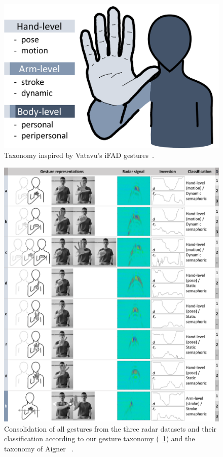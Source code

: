 \begin{figure}[h]
    \centering
    \includegraphics[width=.60\linewidth]{Figures/RadarExperiments/Datasets/20Gestures/gesture-taxonomy.pdf}
    \vspace{-2pt}
    \caption{Taxonomy inspired by Vatavu's iFAD gestures~\cite{Vatavu:2023b}.}
    \label{fig:radar-experiments:taxonomy}
    \vspace{-6pt}
\end{figure}

\begin{figure}
    \centering
    \includegraphics[width=\linewidth]{Figures/RadarExperiments/Datasets/gesture-table-new-1.pdf}
    \caption{Consolidation of all gestures from the three radar datasets and their classification according to our gesture taxonomy (\fig~\ref{fig:radar-experiments:taxonomy}) and the taxonomy of Aigner \etal~\cite{Aigner:2012}.}
    \label{fig:radar-experiments:gestures-a}
    \vspace{-8pt}
\end{figure}

